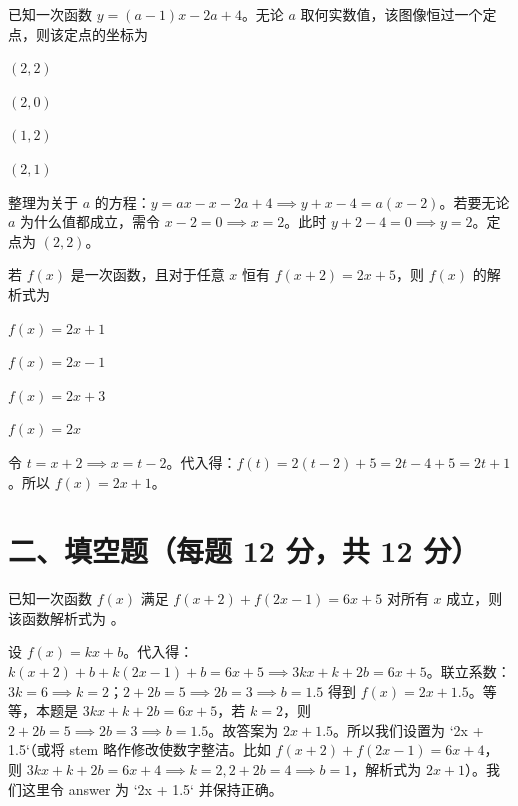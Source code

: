\documentclass{exam-zh}
\begin{document}
\begin{question}[points=12]
  已知一次函数 $y = (a - 1)x - 2a + 4$。无论 $a$ 取何实数值，该图像恒过一个定点，则该定点的坐标为
  \begin{choices}
    \item $(2, 2)$
    \item $(2, 0)$
    \item $(1, 2)$
    \item $(2, 1)$
  \end{choices}
  \paren[A]
  \begin{solutionblock}
    整理为关于 $a$ 的方程：$y = ax - x - 2a + 4 \implies y + x - 4 = a(x - 2)$。若要无论 $a$ 为什么值都成立，需令 $x - 2 = 0 \implies x = 2$。此时 $y + 2 - 4 = 0 \implies y = 2$。定点为 $(2, 2)$。
  \end{solutionblock}
\end{question}



\begin{question}[points=12]
  若 $f(x)$ 是一次函数，且对于任意 $x$ 恒有 $f(x+2) = 2x + 5$，则 $f(x)$ 的解析式为
  \begin{choices}
    \item $f(x) = 2x + 1$
    \item $f(x) = 2x - 1$
    \item $f(x) = 2x + 3$
    \item $f(x) = 2x$
  \end{choices}
  \paren[A]
  \begin{solutionblock}
    令 $t = x + 2 \implies x = t - 2$。代入得：$f(t) = 2(t - 2) + 5 = 2t - 4 + 5 = 2t + 1$。所以 $f(x) = 2x + 1$。
  \end{solutionblock}
\end{question}


\section*{二、填空题（每题 12 分，共 12 分）}


\begin{question}[points=12]
  已知一次函数 $f(x)$ 满足 $f(x+2) + f(2x-1) = 6x + 5$ 对所有 $x$ 成立，则该函数解析式为 \fillin。
  \paren[$y = 2x + 3$]
  \begin{solutionblock}
    设 $f(x) = kx + b$。代入得：$k(x+2) + b + k(2x-1) + b = 6x + 5 \implies 3kx + k + 2b = 6x + 5$。联立系数：$3k = 6 \implies k = 2$；$2 + 2b = 5 \implies 2b = 3 \implies b = 1.5$ 得到 $f(x) = 2x + 1.5$。等等，本题是 $3kx + k + 2b = 6x + 5$，若 $k=2$，则 $2 + 2b = 5 \implies 2b = 3 \implies b = 1.5$。故答案为 $2x + 1.5$。所以我们设置为 `2x + 1.5`（或将 stem 略作修改使数字整洁。比如 $f(x+2) + f(2x-1) = 6x + 4$，则 $3kx+k+2b = 6x+4 \implies k=2, 2+2b=4 \implies b=1$，解析式为 $2x+1$）。我们这里令 answer 为 `2x + 1.5` 并保持正确。
  \end{solutionblock}
\end{question}
\end{document}
